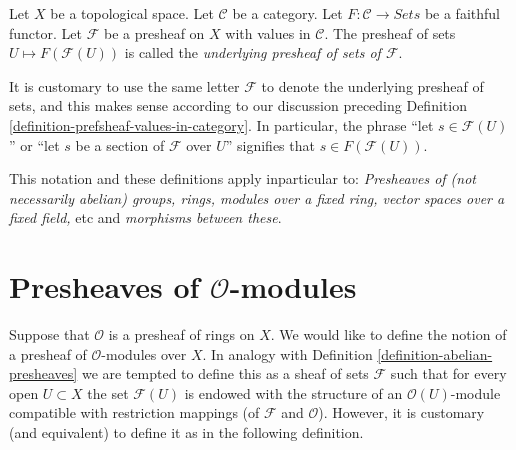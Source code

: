 \begin{definition}
\label{definition-underlying-presheaf-sets}
Let $X$ be a topological space. Let $\mathcal{C}$ be a category.
Let $F : \mathcal{C} \to \textit{Sets}$ be a faithful functor.
Let $\mathcal{F}$ be a presheaf on $X$ with values in $\mathcal{C}$.
The presheaf of sets $U \mapsto F(\mathcal{F}(U))$
is called the {\it underlying presheaf of sets of $\mathcal{F}$}.
\end{definition}

\noindent
It is customary to use the same letter $\mathcal{F}$ to denote
the underlying presheaf of sets, and this makes
sense according to our discussion preceding
Definition \ref{definition-prefsheaf-values-in-category}.
In particular, the phrase ``let $s \in \mathcal{F}(U)$''
or ``let $s$ be a section of $\mathcal{F}$ over $U$'' signifies
that $s \in F(\mathcal{F}(U))$.

\medskip\noindent
This notation and these definitions apply inparticular to:
{\it Presheaves of (not necessarily abelian) groups, rings, modules
over a fixed ring, vector spaces over a fixed field,} etc and
{\it morphisms between these}.

\section{Presheaves of $\mathcal{O}$-modules}
\label{section-presheaves-modules}

\noindent
Suppose that $\mathcal{O}$ is a presheaf of rings on $X$.
We would like to define the notion of a presheaf of
$\mathcal{O}$-modules over $X$. In analogy with Definition
\ref{definition-abelian-presheaves} we are tempted to define 
this as a sheaf of sets $\mathcal{F}$ such that for every open
$U \subset X$ the set $\mathcal{F}(U)$ is endowed with the structure
of an $\mathcal{O}(U)$-module compatible with restriction mappings
(of $\mathcal{F}$ and $\mathcal{O}$). However, it is customary
(and equivalent) to define it as in the following definition.


